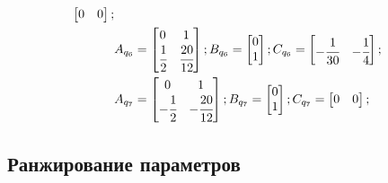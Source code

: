 \begin{align}
\begin{bmatrix}
	0 & 0
	\end{bmatrix};\\
	&A_{q_6} = 
	\begin{bmatrix}
	0 & 1\\
	\cfrac{1}{2} & \cfrac{20}{12}
	\end{bmatrix};
	B_{q_6} = 
	\begin{bmatrix}
	0\\
	1
	\end{bmatrix};
	C_{q_6} = 
	\begin{bmatrix}
	- \cfrac{1}{30} & - \cfrac{1}{4}
	\end{bmatrix};\\
	&A_{q_7} = 
	\begin{bmatrix}
	0 & 1\\
	- \cfrac{1}{2} & - \cfrac{20}{12}
	\end{bmatrix};
	B_{q_7} = 
	\begin{bmatrix}
	0\\
	1
	\end{bmatrix};
	C_{q_7} = 
	\begin{bmatrix}
	0 & 0
	\end{bmatrix};
\end{align}

\subsection{Ранжирование параметров}

